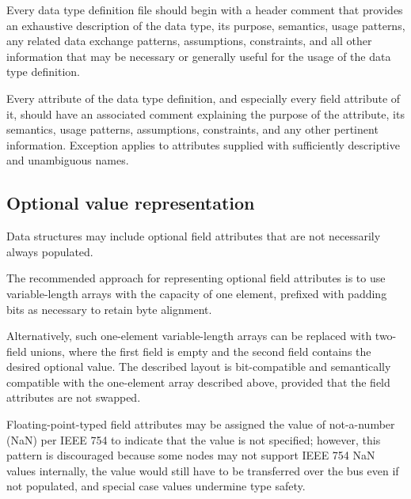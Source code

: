 Every data type definition file should begin with a header comment that provides an exhaustive description
of the data type, its purpose, semantics, usage patterns, any related data exchange patterns,
assumptions, constraints, and all other information that may be necessary or generally useful for the usage of the
data type definition.

Every attribute of the data type definition, and especially every field attribute of it,
should have an associated comment explaining the purpose of the attribute, its semantics, usage patterns,
assumptions, constraints, and any other pertinent information.
Exception applies to attributes supplied with sufficiently descriptive and unambiguous names.


\subsection{Optional value representation}

Data structures may include optional field attributes that are not necessarily always populated.

The recommended approach for representing optional field attributes
is to use variable-length arrays with the capacity of one element,
prefixed with padding bits as necessary to retain byte alignment.

Alternatively, such one-element variable-length arrays can be replaced with two-field unions,
where the first field is empty and the second field contains the desired optional value.
The described layout is bit-compatible and semantically compatible with the one-element array described above,
provided that the field attributes are not swapped.

Floating-point-typed field attributes may be assigned the value of not-a-number (NaN) per IEEE 754
to indicate that the value is not specified;
however, this pattern is discouraged because some nodes may not support IEEE 754 NaN values internally,
the value would still have to be transferred over the bus even if not populated,
and special case values undermine type safety.

